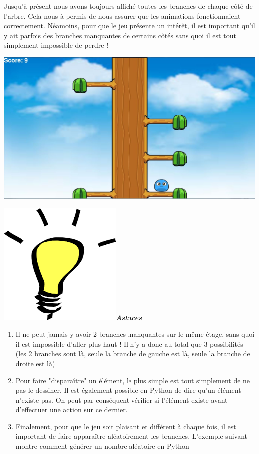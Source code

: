 \documentclass[french]{article}
\newcommand{\tips}{\includegraphics[scale=0.08]{tips}\textbf{\textit{Astuces\\}}}
\begin{document}
Jusqu'à présent nous avons toujours affiché toutes les branches de chaque côté de l'arbre. Cela nous à permis de nous assurer que les animations fonctionnaient correctement. Néamoins, pour que le jeu présente un intérêt, il est important qu'il y ait parfois des branches manquantes de certains côtés sans quoi il est tout simplement impossible de perdre !

\begin{center}
	\includegraphics[scale=0.20]{Image_4}
\end{center}

\tips

\begin{enumerate}

\item Il ne peut jamais y avoir 2 branches manquantes sur le même étage, sans quoi il est impossible d'aller plus haut ! Il n'y a donc au total que 3 possibilités (les 2 branches sont là, seule la branche de gauche est là, seule la branche de droite est là)\\

\item Pour faire "disparaître" un élément, le plus simple est tout simplement de ne pas le dessiner. Il est également possible en Python de dire qu'un élément n'existe pas. On peut par conséquent vérifier si l'élément existe avant d'effectuer une action sur ce dernier.

\begin{center}
	
\end{center}
 
\item Finalement, pour que le jeu soit plaisant et différent à chaque fois, il est important de faire apparaître aléatoirement les branches. L'exemple suivant montre comment générer un nombre aléatoire en Python 

\begin{center}
	
\end{center}

\end{enumerate}
\end{document}
